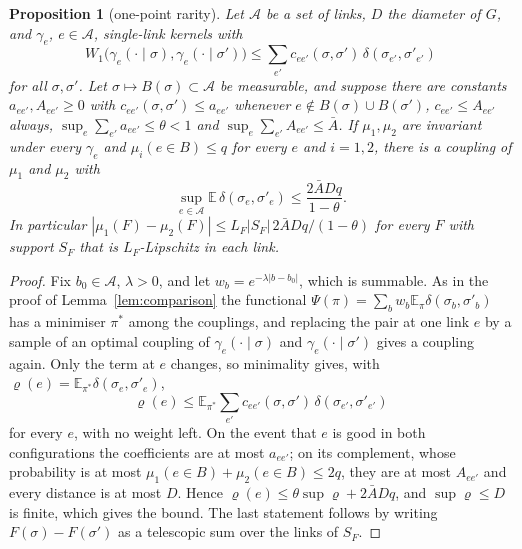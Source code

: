 \documentclass[11pt]{amsart}
\newtheorem{proposition}[theorem]{Proposition}
\theoremstyle{definition}
\theoremstyle{remark}
\numberwithin{equation}{section}
\newcommand{\E}{\mathbb{E}}
\begin{document}
\begin{proposition}[one-point rarity]\label{prop:onepoint}
Let $\mathcal A$ be a set of links, $D$ the diameter of $G$, and
$\gamma_e$, $e\in\mathcal A$, single-link kernels with
\[
W_1\bigl(\gamma_e(\cdot\mid\sigma),\gamma_e(\cdot\mid\sigma')\bigr)\le
\sum_{e'}c_{ee'}(\sigma,\sigma')\,\delta(\sigma_{e'},\sigma'_{e'})
\]
for all $\sigma,\sigma'$. Let $\sigma\mapsto B(\sigma)\subset\mathcal A$ be
measurable, and suppose there are constants $a_{ee'},A_{ee'}\ge0$ with
$c_{ee'}(\sigma,\sigma')\le a_{ee'}$ whenever $e\notin B(\sigma)\cup
B(\sigma')$, $c_{ee'}\le A_{ee'}$ always, $\sup_e\sum_{e'}a_{ee'}\le\theta<1$
and $\sup_e\sum_{e'}A_{ee'}\le\bar A$. If $\mu_1,\mu_2$ are invariant
under every $\gamma_e$ and $\mu_i(e\in B)\le q$ for every $e$ and
$i=1,2$, there is a coupling of $\mu_1$ and $\mu_2$ with
\[
\sup_{e\in\mathcal A}\E\,\delta(\sigma_e,\sigma'_e)\le\frac{2\bar ADq}
{1-\theta}.
\]
In particular $|\mu_1(F)-\mu_2(F)|\le L_F|S_F|\,2\bar ADq/(1-\theta)$ for
every $F$ with support $S_F$ that is $L_F$-Lipschitz in each link.
\end{proposition}

\begin{proof}
Fix $b_0\in\mathcal A$, $\lambda>0$, and let $w_b=e^{-\lambda|b-b_0|}$,
which is summable. As in the proof of Lemma~\ref{lem:comparison} the
functional $\Psi(\pi)=\sum_bw_b\E_\pi\delta(\sigma_b,\sigma'_b)$ has a
minimiser $\pi^*$ among the couplings, and replacing the pair at one link
$e$ by a sample of an optimal coupling of $\gamma_e(\cdot\mid\sigma)$ and
$\gamma_e(\cdot\mid\sigma')$ gives a coupling again. Only the term at $e$
changes, so minimality gives, with $\varrho(e)=\E_{\pi^*}\delta(\sigma_e,
\sigma'_e)$,
\[
\varrho(e)\le\E_{\pi^*}\sum_{e'}c_{ee'}(\sigma,\sigma')\,\delta(\sigma_{e'},
\sigma'_{e'})
\]
for every $e$, with no weight left. On the event that $e$ is good in both
configurations the coefficients are at most $a_{ee'}$; on its complement,
whose probability is at most $\mu_1(e\in B)+\mu_2(e\in B)\le2q$, they are
at most $A_{ee'}$ and every distance is at most $D$. Hence $\varrho(e)\le
\theta\sup\varrho+2\bar ADq$, and $\sup\varrho\le D$ is finite, which gives
the bound. The last statement follows by writing $F(\sigma)-F(\sigma')$ as
a telescopic sum over the links of $S_F$.
\end{proof}
\end{document}
